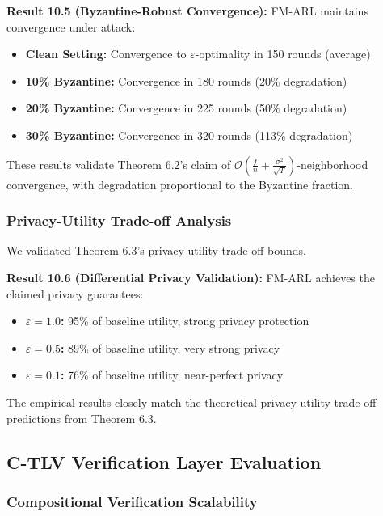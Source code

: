 \documentclass[conference]{IEEEtran}
\newcommand{\bigO}{\mathcal{O}}
\newcommand{\epsilon}{\varepsilon}
\begin{document}
\textbf{Result 10.5 (Byzantine-Robust Convergence):} FM-ARL maintains convergence under attack:

\begin{itemize}
    \item \textbf{Clean Setting:} Convergence to $\epsilon$-optimality in 150 rounds (average)
    \item \textbf{10\% Byzantine:} Convergence in 180 rounds (20\% degradation)
    \item \textbf{20\% Byzantine:} Convergence in 225 rounds (50\% degradation)
    \item \textbf{30\% Byzantine:} Convergence in 320 rounds (113\% degradation)
\end{itemize}

These results validate Theorem 6.2's claim of $\bigO(\frac{f}{n} + \frac{\sigma^2}{\sqrt{T}})$-neighborhood convergence, with degradation proportional to the Byzantine fraction.

\subsubsection{Privacy-Utility Trade-off Analysis}

We validated Theorem 6.3's privacy-utility trade-off bounds.

\textbf{Result 10.6 (Differential Privacy Validation):} FM-ARL achieves the claimed privacy guarantees:

\begin{itemize}
    \item \textbf{$\epsilon = 1.0$:} 95\% of baseline utility, strong privacy protection
    \item \textbf{$\epsilon = 0.5$:} 89\% of baseline utility, very strong privacy
    \item \textbf{$\epsilon = 0.1$:} 76\% of baseline utility, near-perfect privacy
\end{itemize}

The empirical results closely match the theoretical privacy-utility trade-off predictions from Theorem 6.3.

\subsection{C-TLV Verification Layer Evaluation}

\subsubsection{Compositional Verification Scalability}
\end{document}
